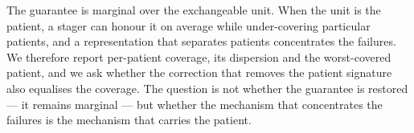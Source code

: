 The guarantee is marginal over the exchangeable unit. When the unit is the
patient, a stager can honour it on average while under-covering particular
patients, and a representation that separates patients concentrates the
failures. We therefore report per-patient coverage, its dispersion and the
worst-covered patient, and we ask whether the correction that removes the
patient signature also equalises the coverage. The question is not whether the
guarantee is restored --- it remains marginal --- but whether the mechanism
that concentrates the failures is the mechanism that carries the patient.
